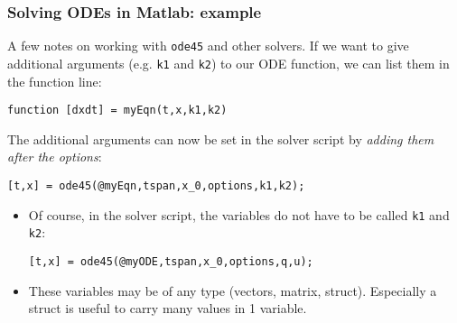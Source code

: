 \begin{frame}[fragile]
  \frametitle{Solving ODEs in Matlab: example}
  A few notes on working with \lstinline$ode45$ and other solvers. If we want to give additional arguments (e.g. \lstinline$k1$ and \lstinline$k2$) to our ODE function, we can list them in the function line:
  \begin{lstlisting}
function [dxdt] = myEqn(t,x,k1,k2)
  \end{lstlisting}
  The additional arguments can now be set in the solver script by \emph{adding them after the options}:
  \begin{lstlisting}
[t,x] = ode45(@myEqn,tspan,x_0,options,k1,k2);
    \end{lstlisting}
  \pause
  \begin{itemize}
    \item Of course, in the solver script, the variables do not have to be called \lstinline$k1$ and \lstinline$k2$:
      \begin{lstlisting}
[t,x] = ode45(@myODE,tspan,x_0,options,q,u);
    \end{lstlisting}
    \item These variables may be of any type (vectors, matrix, struct). Especially a struct is useful to carry many values in 1 variable.
  \end{itemize}
\end{frame}


